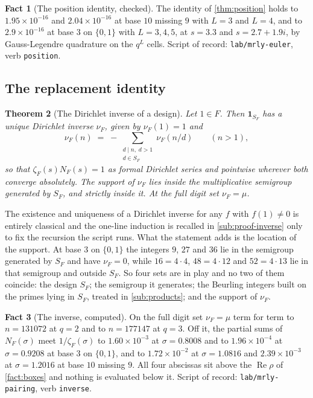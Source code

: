 \documentclass[11pt]{amsart}
\newtheorem{theorem}{Theorem}[section]
\theoremstyle{definition}
\newtheorem{fact}[theorem]{Fact}
\theoremstyle{remark}
\begin{document}
\begin{fact}[The position identity, checked]
\label{fact:position}
The identity of \cref{thm:position} holds to $1.95 \times 10^{-16}$ and $2.04 \times 10^{-16}$ at base $10$ missing $9$ with $L = 3$ and $L = 4$, and to $2.9 \times 10^{-16}$ at base $3$ on $\{0,1\}$ with $L = 3,4,5$, at $s = 3.3$ and $s = 2.7 + 1.9i$, by Gauss-Legendre quadrature on the $q^{L}$ cells. Script of record: \texttt{lab/mrly-euler}, verb \texttt{position}.
\end{fact}

\subsection{The replacement identity}
\label{sub:inverse}

\begin{theorem}[The Dirichlet inverse of a design]
\label{thm:inverse}
Let $1 \in F$. Then $\mathbf{1}_{S_{F}}$ has a unique Dirichlet inverse $\nu_{F}$, given by $\nu_{F}(1) = 1$ and
\[
  \nu_{F}(n) \;=\; -\!\!\sum_{\substack{d \mid n,\; d > 1 \\ d \in S_{F}}}\!\! \nu_{F}(n/d) \qquad (n > 1),
\]
so that $\zeta_{F}(s) N_{F}(s) = 1$ as formal Dirichlet series and pointwise wherever both converge absolutely. The support of $\nu_{F}$ lies inside the multiplicative semigroup generated by $S_{F}$, and strictly inside it. At the full digit set $\nu_{F} = \mu$.
\end{theorem}

The existence and uniqueness of a Dirichlet inverse for any $f$ with $f(1) \ne 0$ is entirely classical and the one-line induction is recalled in \cref{sub:proof-inverse} only to fix the recursion the script runs. What the statement adds is the location of the support. At base $3$ on $\{0,1\}$ the integers $9$, $27$ and $36$ lie in the semigroup generated by $S_{F}$ and have $\nu_{F} = 0$, while $16 = 4 \cdot 4$, $48 = 4 \cdot 12$ and $52 = 4 \cdot 13$ lie in that semigroup and outside $S_{F}$. So four sets are in play and no two of them coincide: the design $S_{F}$; the semigroup it generates; the Beurling integers built on the primes lying in $S_{F}$, treated in \cref{sub:products}; and the support of $\nu_{F}$.

\begin{fact}[The inverse, computed]
\label{fact:inverse}
On the full digit set $\nu_{F} = \mu$ term for term to $n = 131072$ at $q = 2$ and to $n = 177147$ at $q = 3$. Off it, the partial sums of $N_{F}(\sigma)$ meet $1/\zeta_{F}(\sigma)$ to $1.60 \times 10^{-3}$ at $\sigma = 0.8008$ and to $1.96 \times 10^{-4}$ at $\sigma = 0.9208$ at base $3$ on $\{0,1\}$, and to $1.72 \times 10^{-2}$ at $\sigma = 1.0816$ and $2.39 \times 10^{-3}$ at $\sigma = 1.2016$ at base $10$ missing $9$. All four abscissas sit above the $\operatorname{Re}\rho$ of \cref{fact:boxes} and nothing is evaluated below it. Script of record: \texttt{lab/mrly-pairing}, verb \texttt{inverse}.
\end{fact}
\end{document}
